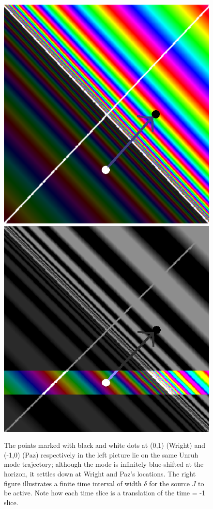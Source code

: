 \documentclass[12pt,a4paper]{article}
\begin{document}
{\begin{itemize}
\begin{figure}[h]
\centering
\includegraphics[scale=0.75]{paz_freq.png}
\hspace{20 pt}
\includegraphics[scale=0.235]{paz_bw.png}
\captionsetup{width=0.7\textwidth}
\caption{The points marked with black and white dots at (0,1) (Wright) and (-1,0) (Paz) respectively in the left picture lie on the same Unruh mode trajectory; although the mode is infinitely blue-shifted at the horizon, it settles down at Wright and Paz's locations. The right figure illustrates a finite time interval of width $\delta$ for the source $J$ to be active. Note how each time slice is a translation of the time = -1 slice.}
\label{paz_freq}
\end{figure}



\end{itemize}}
\end{document}
